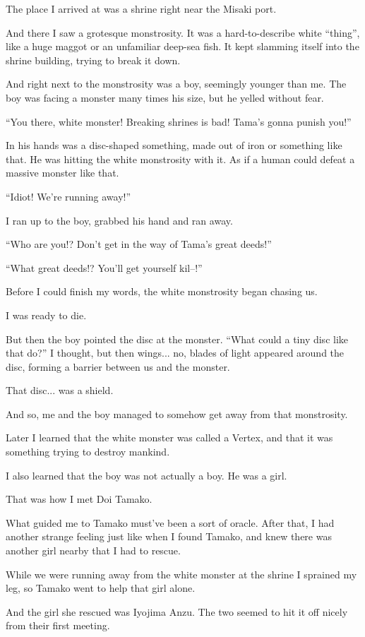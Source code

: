 The place I arrived at was a shrine right near the Misaki port.

And there I saw a grotesque monstrosity. It was a hard-to-describe white ``thing'', like a huge maggot or an unfamiliar deep-sea fish. It kept slamming itself into the shrine building, trying to break it down.

And right next to the monstrosity was a boy, seemingly younger than me. The boy was facing a monster many times his size, but he yelled without fear.

``You there, white monster! Breaking shrines is bad! Tama's gonna punish you!''

In his hands was a disc-shaped something, made out of iron or something like that. He was hitting the white monstrosity with it. As if a human could defeat a massive monster like that.

``Idiot! We're running away!''

I ran up to the boy, grabbed his hand and ran away.

``Who are you!? Don't get in the way of Tama's great deeds!''

``What great deeds!? You'll get yourself kil--!''

Before I could finish my words, the white monstrosity began chasing us.

I was ready to die.

But then the boy pointed the disc at the monster. ``What could a tiny disc like that do?'' I thought, but then wings... no, blades of light appeared around the disc, forming a barrier between us and the monster.

That disc... was a shield.

And so, me and the boy managed to somehow get away from that monstrosity.

Later I learned that the white monster was called a Vertex, and that it was something trying to destroy mankind.

I also learned that the boy was not actually a boy. He was a girl.

That was how I met Doi Tamako.

What guided me to Tamako must've been a sort of oracle. After that, I had another strange feeling just like when I found Tamako, and knew there was another girl nearby that I had to rescue.

While we were running away from the white monster at the shrine I sprained my leg, so Tamako went to help that girl alone.

And the girl she rescued was Iyojima Anzu. The two seemed to hit it off nicely from their first meeting.

